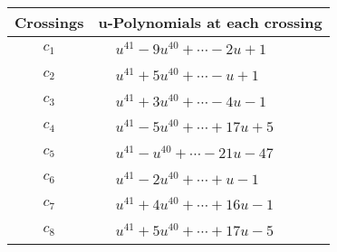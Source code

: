 \documentclass[1p]{elsarticle_modified}
\theoremstyle{definition}
\begin{document}
\begin{tabular}{m{50pt}|m{274pt}}
Crossings & \hspace{64pt}u-Polynomials at each crossing \\
\hline $$\begin{aligned}c_{1}\end{aligned}$$&$\begin{aligned}
&u^{41}-9 u^{40}+\cdots-2 u+1
\end{aligned}$\\
\hline $$\begin{aligned}c_{2}\end{aligned}$$&$\begin{aligned}
&u^{41}+5 u^{40}+\cdots- u+1
\end{aligned}$\\
\hline $$\begin{aligned}c_{3}\end{aligned}$$&$\begin{aligned}
&u^{41}+3 u^{40}+\cdots-4 u-1
\end{aligned}$\\
\hline $$\begin{aligned}c_{4}\end{aligned}$$&$\begin{aligned}
&u^{41}-5 u^{40}+\cdots+17 u+5
\end{aligned}$\\
\hline $$\begin{aligned}c_{5}\end{aligned}$$&$\begin{aligned}
&u^{41}- u^{40}+\cdots-21 u-47
\end{aligned}$\\
\hline $$\begin{aligned}c_{6}\end{aligned}$$&$\begin{aligned}
&u^{41}-2 u^{40}+\cdots+u-1
\end{aligned}$\\
\hline $$\begin{aligned}c_{7}\end{aligned}$$&$\begin{aligned}
&u^{41}+4 u^{40}+\cdots+16 u-1
\end{aligned}$\\
\hline $$\begin{aligned}c_{8}\end{aligned}$$&$\begin{aligned}
&u^{41}+5 u^{40}+\cdots+17 u-5
\end{aligned}$\\

\end{tabular}
\end{document}
